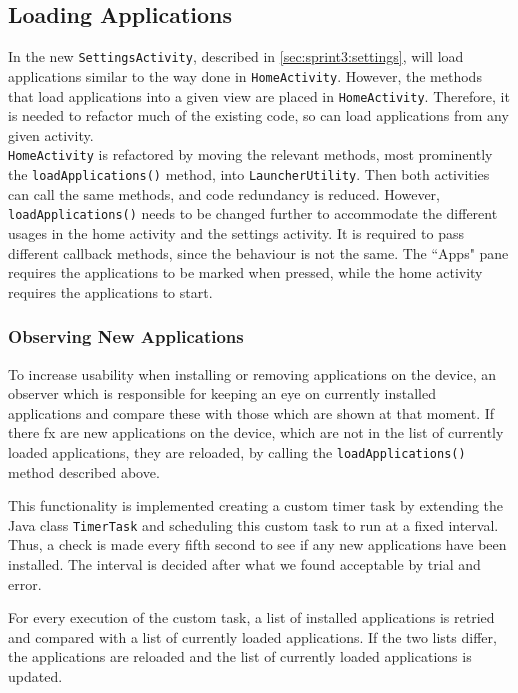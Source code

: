 \subsection{Loading Applications}\label{sect:sprint3:refactoring}
In the new \lstinline!SettingsActivity!, described in \cref{sec:sprint3:settings}, \launcher will load applications similar to the way done in \lstinline|HomeActivity|.
However, the methods that load applications into a given view are placed in \lstinline!HomeActivity!.
Therefore, it is needed to refactor much of the existing code, so \launcher can load applications from any given activity.\\

\lstinline!HomeActivity! is refactored by moving the relevant methods, most prominently the \lstinline|loadApplications()| method, into \lstinline!LauncherUtility!.
Then both activities can call the same methods, and code redundancy is reduced. 
However, \lstinline|loadApplications()| needs to be changed further to accommodate the different usages in the home activity and the settings activity. 
It is required to pass different callback methods, since the behaviour is not the same.
The ``Apps" pane requires the applications to be marked when pressed, while the home activity requires the applications to start.

\subsubsection{Observing New Applications}\label{sec:sprint3:observing}
To increase usability when installing or removing applications on the device, an observer which is responsible for keeping an eye on currently installed applications and compare these with those which are shown at that moment. 
If there fx are new applications on the device, which are not in the list of currently loaded applications, they are reloaded, by calling the \lstinline|loadApplications()| method described above.

This functionality is implemented creating a custom timer task by extending the Java class \lstinline!TimerTask! and scheduling this custom task to run at a fixed interval. 
Thus, a check is made every fifth second to see if any new applications have been installed.
The interval is decided after what we found acceptable by trial and error.

For every execution of the custom task, a list of installed applications is retried and compared with a list of currently loaded applications.
If the two lists differ, the applications are reloaded and the list of currently loaded applications is updated.
